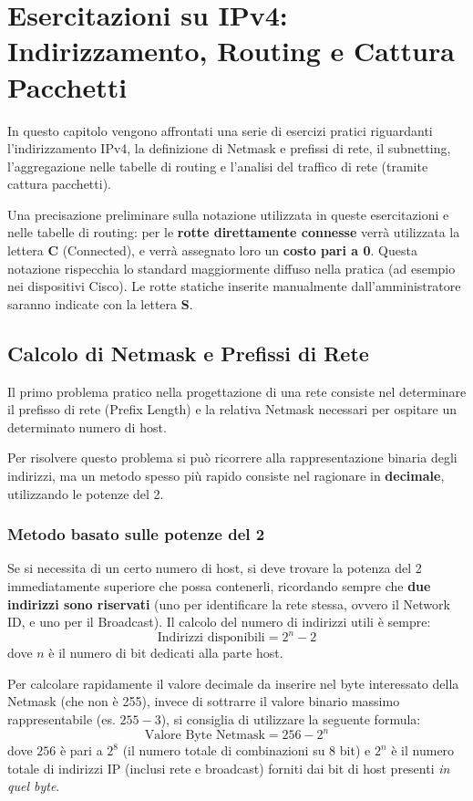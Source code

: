\chapter{Esercitazioni su IPv4: Indirizzamento, Routing e Cattura Pacchetti}

In questo capitolo vengono affrontati una serie di esercizi pratici riguardanti l'indirizzamento IPv4, la definizione di Netmask e prefissi di rete, il subnetting, l'aggregazione nelle tabelle di routing e l'analisi del traffico di rete (tramite cattura pacchetti). 

Una precisazione preliminare sulla notazione utilizzata in queste esercitazioni e nelle tabelle di routing: per le \textbf{rotte direttamente connesse} verrà utilizzata la lettera \textbf{C} (Connected), e verrà assegnato loro un \textbf{costo pari a 0}. Questa notazione rispecchia lo standard maggiormente diffuso nella pratica (ad esempio nei dispositivi Cisco). Le rotte statiche inserite manualmente dall'amministratore saranno indicate con la lettera \textbf{S}.

\section{Calcolo di Netmask e Prefissi di Rete}

Il primo problema pratico nella progettazione di una rete consiste nel determinare il prefisso di rete (Prefix Length) e la relativa Netmask necessari per ospitare un determinato numero di host. 

Per risolvere questo problema si può ricorrere alla rappresentazione binaria degli indirizzi, ma un metodo spesso più rapido consiste nel ragionare in \textbf{decimale}, utilizzando le potenze del 2. 

\subsection{Metodo basato sulle potenze del 2}
Se si necessita di un certo numero di host, si deve trovare la potenza del 2 immediatamente superiore che possa contenerli, ricordando sempre che \textbf{due indirizzi sono riservati} (uno per identificare la rete stessa, ovvero il Network ID, e uno per il Broadcast). Il calcolo del numero di indirizzi utili è sempre:
\[ \text{Indirizzi disponibili} = 2^n - 2 \]
dove \( n \) è il numero di bit dedicati alla parte host.

Per calcolare rapidamente il valore decimale da inserire nel byte interessato della Netmask (che non è 255), invece di sottrarre il valore binario massimo rappresentabile (es. $255 - 3$), si consiglia di utilizzare la seguente formula:
\[ \text{Valore Byte Netmask} = 256 - 2^n \]
dove \( 256 \) è pari a $2^8$ (il numero totale di combinazioni su 8 bit) e \( 2^n \) è il numero totale di indirizzi IP (inclusi rete e broadcast) forniti dai bit di host presenti \textit{in quel byte}.

